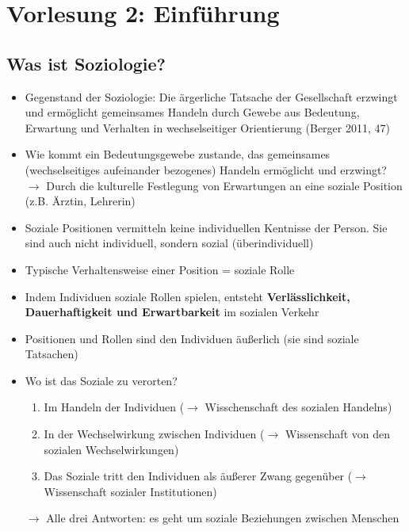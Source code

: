 \documentclass{scrartcl}
\begin{document}
\section*{Vorlesung 2: Einführung}
\subsection*{Was ist Soziologie?}
\begin{itemize}
    \item
        Gegenstand der Soziologie: Die ärgerliche Tatsache der Gesellschaft erzwingt und ermöglicht gemeinsames Handeln durch Gewebe aus Bedeutung, Erwartung und Verhalten in wechselseitiger Orientierung (Berger 2011, 47)
    \item
        Wie kommt ein Bedeutungsgewebe zustande, das gemeinsames (wechselseitiges aufeinander bezogenes) Handeln ermöglicht und erzwingt?\\
        $\rightarrow$ Durch die kulturelle Festlegung von Erwartungen an eine soziale Position (z.B. Ärztin, Lehrerin)
    \item
        Soziale Positionen vermitteln keine individuellen Kentnisse der Person. Sie sind auch nicht individuell, sondern sozial (überindividuell)
    \item
        Typische Verhaltensweise einer Position = soziale Rolle
    \item
        Indem Individuen soziale Rollen spielen, entsteht \textbf{Verlässlichkeit, Dauerhaftigkeit und Erwartbarkeit} im sozialen Verkehr
    \item
        Positionen und Rollen sind den Individuen äußerlich (sie sind soziale Tatsachen)
\end{itemize}

\begin{itemize}
    \item
        Wo ist das Soziale zu verorten?
        \begin{enumerate}
            \item
                Im Handeln der Individuen ($\rightarrow$ Wisschenschaft des sozialen Handelns)
            \item
                In der Wechselwirkung zwischen Individuen ($\rightarrow$ Wissenschaft von den sozialen Wechselwirkungen)
            \item
                Das Soziale tritt den Individuen als äußerer Zwang gegenüber ($\rightarrow$ Wissenschaft sozialer Institutionen)
        \end{enumerate}
        $\rightarrow$ Alle drei Antworten: es geht um soziale Beziehungen zwischen Menschen
\end{itemize}
\end{document}
